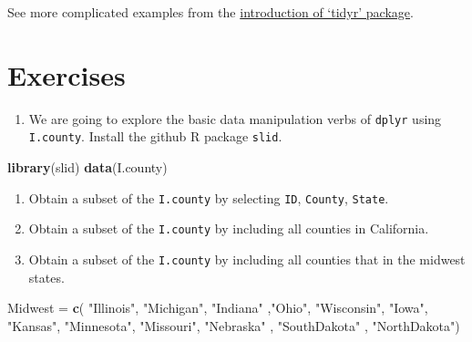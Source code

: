 \documentclass[]{book}
\newenvironment{Shaded}{\begin{snugshade}}{\end{snugshade}}
\newcommand{\KeywordTok}[1]{\textcolor[rgb]{0.13,0.29,0.53}{\textbf{#1}}}
\newcommand{\StringTok}[1]{\textcolor[rgb]{0.31,0.60,0.02}{#1}}
\newcommand{\NormalTok}[1]{#1}
\providecommand{\tightlist}{%
  \setlength{\itemsep}{0pt}\setlength{\parskip}{0pt}}
\begin{document}
See more complicated examples from the
\href{https://tidyr.tidyverse.org/reference/pivot_longer.html}{introduction
of `tidyr' package}.

\section{Exercises}\label{exercises}

\begin{enumerate}
\def\labelenumi{\arabic{enumi}.}
\tightlist
\item
  We are going to explore the basic data manipulation verbs of
  \texttt{dplyr} using \texttt{I.county}. Install the github R package
  \texttt{slid}.
\end{enumerate}

\begin{Shaded}
\begin{Highlighting}[]
\KeywordTok{library}\NormalTok{(slid)}
\KeywordTok{data}\NormalTok{(I.county)}
\end{Highlighting}
\end{Shaded}

\begin{enumerate}
\def\labelenumi{(\alph{enumi})}
\item
  Obtain a subset of the \texttt{I.county} by selecting \texttt{ID},
  \texttt{County}, \texttt{State}.
\item
  Obtain a subset of the \texttt{I.county} by including all counties in
  California.
\item
  Obtain a subset of the \texttt{I.county} by including all counties
  that in the midwest states.
\end{enumerate}

\begin{Shaded}
\begin{Highlighting}[]
\NormalTok{Midwest  =}\StringTok{ }\KeywordTok{c}\NormalTok{( }\StringTok{"Illinois"}\NormalTok{, }\StringTok{"Michigan"}\NormalTok{, }\StringTok{"Indiana"}\NormalTok{ ,}\StringTok{"Ohio"}\NormalTok{, }
\StringTok{"Wisconsin"}\NormalTok{, }\StringTok{"Iowa"}\NormalTok{, }\StringTok{"Kansas"}\NormalTok{, }\StringTok{"Minnesota"}\NormalTok{, }\StringTok{"Missouri"}\NormalTok{, }
\StringTok{"Nebraska"}\NormalTok{ , }\StringTok{"SouthDakota"}\NormalTok{ , }\StringTok{"NorthDakota"}\NormalTok{)}
\end{Highlighting}
\end{Shaded}
\end{document}
